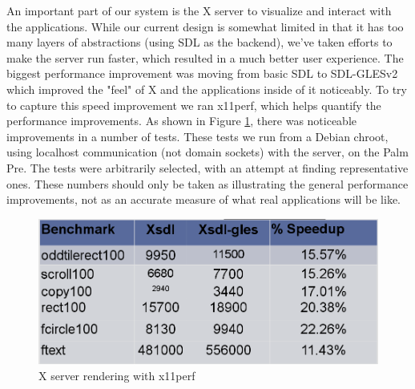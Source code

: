 An important part of our system is the X server to visualize and interact with the applications.  While our current design is somewhat limited in that it has too many layers of abstractions (using SDL as the backend), we've taken efforts to make the server run faster, which resulted in a much better user experience.  The biggest  performance improvement was moving from basic SDL to SDL-GLESv2 which improved the "feel" of X and the applications inside of it noticeably.  To try to capture this speed improvement we ran x11perf, which helps quantify the performance improvements.  As shown in Figure \ref{fig:x_results}, there was noticeable improvements in a number of tests.
These tests we run from a Debian chroot, using localhost communication (not domain sockets) with the server, on the Palm Pre.  The tests were arbitrarily selected, with an attempt at finding representative ones.  These numbers should only be taken as illustrating the general performance improvements, not as an accurate measure of what real applications will be like.
\begin{figure}[tbh]
\centering
\includegraphics[width=1.0\columnwidth]{x_results}
\caption{X server rendering with x11perf}
\label{fig:x_results}
\end{figure}
